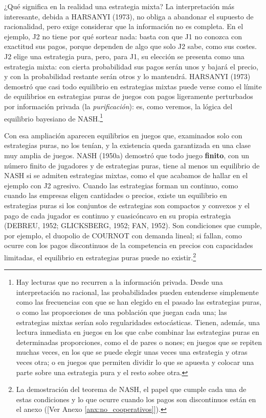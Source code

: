 \documentclass[10pt,a4paper]{article}
\newcommand{\authorfont}[1]{{\fontfamily{EBGaramond-TLF}\selectfont #1}}
\newcounter{anexo}
\begin{document}
¿Qué significa en la realidad una estrategia mixta? La interpretación más interesante, debida a HARSANYI (1973), no obliga a abandonar el supuesto de racionalidad, pero exige considerar que la información no es completa. En el ejemplo, J2 no tiene por qué sortear nada: basta con que J1 no conozca con exactitud sus pagos, porque dependen de algo que solo J2 sabe, como sus costes. J2 elige una estrategia pura, pero, para J1, su elección se presenta como una estrategia mixta: con cierta probabilidad sus pagos serán unos y bajará el precio, y con la probabilidad restante serán otros y lo mantendrá. HARSANYI (1973) demostró que casi todo equilibrio en estrategias mixtas puede verse como el límite de equilibrios en estrategias puras de juegos con pagos ligeramente perturbados por información privada (la \textit{purificación}): es, como veremos, la lógica del equilibrio bayesiano de NASH.\footnote{%
  Hay lecturas que no recurren a la información privada. Desde una interpretación no racional, las probabilidades pueden entenderse simplemente como las frecuencias con que se han elegido en el pasado las estrategias puras, o como las proporciones de una población que juegan cada una; las estrategias mixtas serían solo regularidades estocásticas. Tienen, además, una lectura inmediata en juegos en los que cabe combinar las estrategias puras en determinadas proporciones, como el de pares o nones; en juegos que se repiten muchas veces, en los que se puede elegir unas veces una estrategia y otras veces otra; o en juegos que permiten dividir lo que se apuesta y colocar una parte sobre una estrategia pura y el resto sobre otra.
}

Con esa ampliación aparecen equilibrios en juegos que, examinados solo con estrategias puras, no los tenían, y la existencia queda garantizada en una clase muy amplia de juegos. NASH (1950a) demostró que todo juego \textbf{finito}, con un número finito de jugadores y de estrategias puras, tiene al menos un equilibrio de NASH si se admiten estrategias mixtas, como el que acabamos de hallar en el ejemplo con J2 agresivo. Cuando las estrategias forman un continuo, como cuando las empresas eligen cantidades o precios, existe un equilibrio en estrategias puras si los conjuntos de estrategias son compactos y convexos y el pago de cada jugador es continuo y cuasicóncavo en su propia estrategia (DEBREU, 1952; GLICKSBERG, 1952; FAN, 1952). Son condiciones que cumple, por ejemplo, el duopolio de COURNOT con demanda lineal; si fallan, como ocurre con los pagos discontinuos de la competencia en precios con capacidades limitadas, el equilibrio en estrategias puras puede no existir.\footnote{%
  La demostración del teorema de NASH, el papel que cumple cada una de estas condiciones y lo que ocurre cuando los pagos son discontinuos están en el anexo ([\authorfont{Ver Anexo \ref{anx:no_cooperativos}}]).
}
\end{document}
